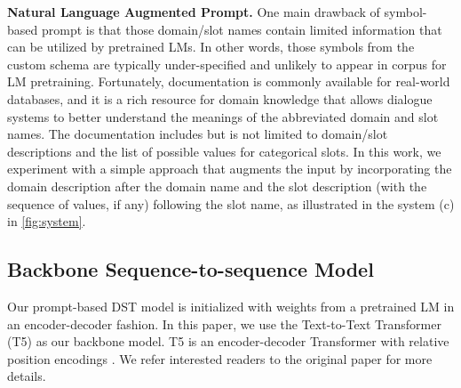 \documentclass[11pt]{article}
\begin{document}
\noindent
\textbf{Natural Language Augmented Prompt.}
One main drawback of symbol-based prompt is that those domain/slot names contain limited information that can be utilized by pretrained LMs.
In other words, those symbols from the custom schema are typically under-specified and unlikely to appear in corpus for LM pretraining.
Fortunately, documentation is commonly available for real-world databases, and it is a rich resource for domain knowledge
that allows dialogue systems to better understand the meanings of the abbreviated domain and slot names.
The documentation includes but is not limited to domain/slot descriptions and the list of possible values for categorical slots.
In this work, we experiment with a simple approach that augments the input by incorporating the domain description after the domain name and the slot description (with the sequence of values, if any) following the slot name, as illustrated in the system (c) in \autoref{fig:system}.

\subsection{Backbone Sequence-to-sequence Model}
Our prompt-based DST model is initialized with weights from a pretrained LM in an encoder-decoder fashion.
In this paper, we use the Text-to-Text Transformer (T5) \cite{raffel2020exploring} as our backbone model.
T5 is an encoder-decoder Transformer with relative position encodings \cite{shaw2018self}. We refer interested readers to the original paper for more details.
\end{document}
